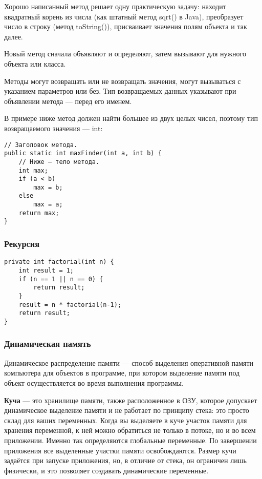 \documentclass[12pt]{matmex-diploma}
\begin{document}
        Хорошо написанный метод решает одну практическую задачу: находит квадратный корень из числа (как штатный метод sqrt() в Java), преобразует число в строку (метод toString()), присваивает значения полям объекта и так далее.

        Новый метод сначала объявляют и определяют, затем вызывают для нужного объекта или класса.
        
        Методы могут возвращать или не возвращать значения, могут вызываться с указанием параметров или без. Тип возвращаемых данных указывают при объявлении метода — перед его именем.

        В примере ниже метод должен найти большее из двух целых чисел, поэтому тип возвращаемого значения — int:
        
        \begin{verbatim}
// Заголовок метода.        
public static int maxFinder(int a, int b) { 
    // Ниже — тело метода.
    int max;
    if (a < b)
        max = b;
    else
        max = a;
    return max;
}
        \end{verbatim}      
    
    \subsubsection*{Рекурсия}
        \begin{verbatim}
private int factorial(int n) {
    int result = 1;
    if (n == 1 || n == 0) {
        return result;
    }
    result = n * factorial(n-1);
    return result;
}
        \end{verbatim} 
        
    \subsubsection*{Динамическая память}
        Динамическое распределение памяти — способ выделения оперативной памяти компьютера для объектов в программе, при котором выделение памяти под объект осуществляется во время выполнения программы.
        
        \textbf{Куча} — это хранилище памяти, также расположенное в ОЗУ, которое допускает динамическое выделение памяти и не работает по принципу стека: это просто склад для ваших переменных. Когда вы выделяете в куче участок памяти для хранения переменной, к ней можно обратиться не только в потоке, но и во всем приложении. Именно так определяются глобальные переменные. По завершении приложения все выделенные участки памяти освобождаются. Размер кучи задаётся при запуске приложения, но, в отличие от стека, он ограничен лишь физически, и это позволяет создавать динамические переменные.
\end{document}
